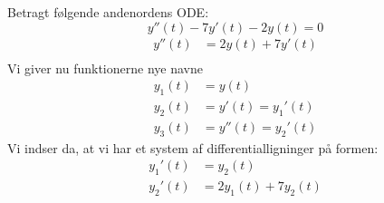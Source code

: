 \begin{Example}
\textnormal{Betragt følgende andenordens ODE:}
$$y''(t) - 7y'(t) - 2y(t) = 0 $$
\begin{align*}
    y''(t) &= 2y(t) + 7y'(t)\\
\end{align*}
\textnormal{Vi giver nu funktionerne nye navne}
\begin{align*}
    y_1(t) &= y(t)\\
    y_2(t) &= y'(t) = y_1'(t)\\
    y_3(t) &= y''(t) = y_2'(t)
\end{align*}
\textnormal{Vi indser da, at vi har et system af differentialligninger på formen:}
\begin{align*}
    y_1'(t) &= y_2(t)\\
    y_2'(t) &= 2y_1(t) + 7y_2(t)
\end{align*}
\end{Example}